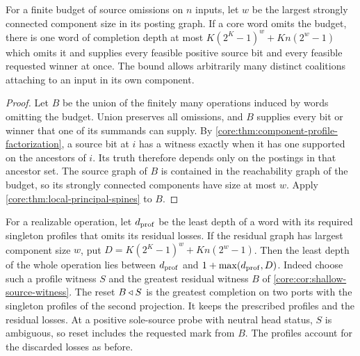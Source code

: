 \begin{corollary}
\label{core:cor:shallow-source-witness}
For a finite budget of source omissions on $n$ inputs, let $w$ be the
largest strongly connected component size in its posting graph.
If a core word omits the budget, there is one word of completion depth
at most $K(2^K-1)^w+Kn(2^w-1)$ which omits it and supplies every feasible
positive source bit and every feasible requested winner at once.
The bound allows arbitrarily many distinct coalitions attaching to an
input in its own component.
\end{corollary}
\begin{proof}
Let $B$ be the union of the finitely many operations induced by words
omitting the budget. Union preserves all omissions, and $B$ supplies
every bit or winner that one of its summands can supply.
By \cref{core:thm:component-profile-factorization}, a source bit at $i$
has a witness exactly when it has one supported on the ancestors of
$i$. Its truth therefore depends only on the postings in that ancestor
set. The source graph of $B$ is contained in the reachability graph
of the budget, so its strongly connected components have size at most
$w$. Apply \cref{core:thm:local-principal-spines} to $B$.
\end{proof}

For a realizable operation, let $d_{\rm prof}$ be the least depth of a
word with its required singleton profiles that omits its residual
losses. If the residual graph has largest component size $w$, put
$D=K(2^K-1)^w+Kn(2^w-1)$. Then the least depth of the whole operation
lies between $d_{\rm prof}$ and $1+\max(d_{\rm prof},D)$. Indeed choose
such a profile witness $S$ and the greatest residual witness $B$ of
\cref{core:cor:shallow-source-witness}. The reset $B\mathbin{\triangleleft} S$ is the
greatest completion on two ports with the singleton profiles of the
second projection. It keeps the prescribed profiles and the residual
losses. At a positive sole-source probe with neutral head status, $S$
is ambiguous, so reset includes the requested mark from $B$. The
profiles account for the discarded losses as before.

